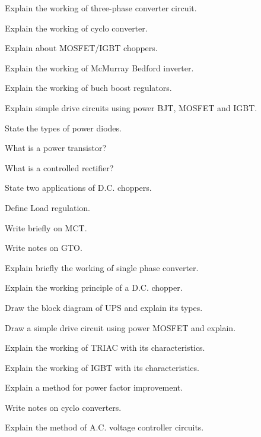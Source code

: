 \item Explain the working of three-phase converter circuit.
\Or
\item Explain the working of cyclo converter.

\item Explain about MOSFET/IGBT choppers.
\Or
\item Explain the working of McMurray Bedford inverter.

\item Explain the working of buch boost regulators.
\Or
\item Explain simple drive circuits using power BJT, MOSFET and IGBT.

\markC
\ene

\newpage

\sub{\subj}
\maxtime

\partA

\iitem State the types of power diodes.
\item What is a power transistor?
\item What is a controlled rectifier?
\item State two applications of D.C. choppers.
\item Define Load regulation.

\markA
\partB

\item Write briefly on MCT.
\item Write notes on GTO.
\item Explain briefly the working of single phase converter.
\item Explain the working principle of a D.C. chopper.
\item Draw the block diagram of UPS and explain its types.
\item Draw a simple drive circuit using power MOSFET and explain.

\markB
\partC

\item Explain the working of TRIAC with its characteristics.
\Or
\item Explain the working of IGBT with its characteristics.

\newpage \again

\item \iitem  Explain a method for power factor improvement.
\item Write notes on cyclo converters.
\ene
\Or
\item Explain the method of A.C. voltage controller circuits.

